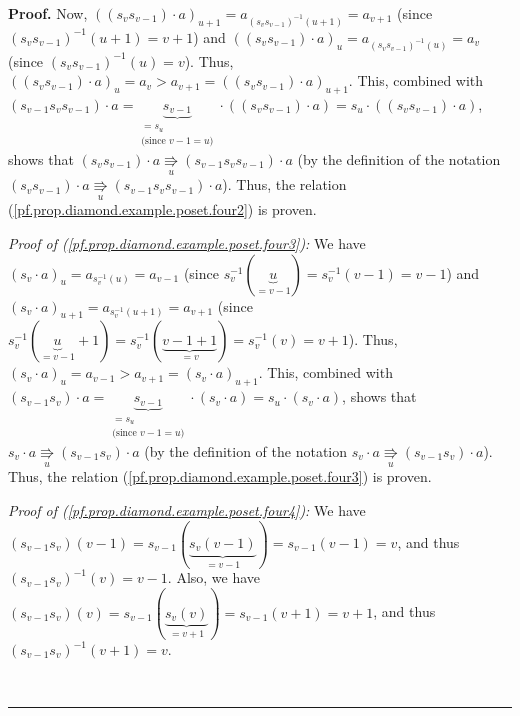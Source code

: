 \documentclass[numbers=enddot,12pt,final,onecolumn,notitlepage]{scrartcl}%
\theoremstyle{definition}
\newenvironment{proof}[1][Proof]{\noindent\textbf{#1.} }{\ \rule{0.5em}{0.5em}}
\newenvironment{verlong}{}{}
\begin{document}
\begin{proof}
\begin{verlong}
Now, $\left(  \left(  s_{v}s_{v-1}\right)  \cdot a\right)  _{u+1}
=a_{\left(
s_{v}s_{v-1}\right)  ^{-1}\left(  u+1\right)  }=a_{v+1}$ (since $\left(
s_{v}s_{v-1}\right)  ^{-1}\left(  u+1\right)  =v+1$) and $\left(  \left(
s_{v}s_{v-1}\right)  \cdot a\right)  _{u}=a_{\left(  s_{v}s_{v-1}\right)
^{-1}\left(  u\right)  }=a_{v}$ (since $\left(  s_{v}s_{v-1}\right)
^{-1}\left(  u\right)  =v$). Thus, $\left(  \left(  s_{v}s_{v-1}\right)
\cdot a\right)  _{u}=a_{v}>a_{v+1}=\left(  \left(  s_{v}s_{v-1}\right)
\cdot a\right)  _{u+1}$. This, combined with $\left(  s_{v-1}s_{v}%
s_{v-1}\right)  \cdot a=\underbrace{s_{v-1}}_{\substack{=s_u \\
\text{(since } v-1=u\text{)}}}
\cdot\left(  \left(  s_{v}s_{v-1}\right)  \cdot
a\right)
= s_u \cdot\left(  \left(  s_{v}s_{v-1}\right)  \cdot
a\right)$, shows that $\left(  s_{v}s_{v-1}\right)  \cdot
a\underset{u}{\Rrightarrow}\left(  s_{v-1}s_{v}s_{v-1}\right)  \cdot a$ (by
the definition of the notation $\left(  s_{v}s_{v-1}\right)  \cdot
a\underset{u}{\Rrightarrow}\left(  s_{v-1}s_{v}s_{v-1}\right)  \cdot a$).
Thus, the
relation (\ref{pf.prop.diamond.example.poset.four2}) is proven.

\textit{Proof of (\ref{pf.prop.diamond.example.poset.four3}):} We have
$\left(  s_{v}\cdot a\right)  _{u}=a_{s_{v}^{-1}\left(  u\right)
}=a_{v-1}$ (since $s_{v}^{-1}\left( \underbrace{u}_{=v-1}\right)
= s_v^{-1}\left(v-1\right) =v-1$) and $\left(
s_{v}\cdot a\right)  _{u+1}=a_{s_{v}^{-1}\left( u+1 \right)  }
=a_{v+1}$ (since $s_{v}^{-1}\left( \underbrace{u}_{=v-1}+1 \right)
= s_v^{-1}\left(\underbrace{v-1+1}_{=v}\right) = s_v^{-1}\left(v\right)
=v+1$). Thus, $\left(  s_{v}\cdot a\right)
_{u}=a_{v-1}>a_{v+1}=\left(  s_{v}\cdot a\right)  _{u+1}$. This, combined with
$\left(  s_{v-1}s_{v}\right)  \cdot a
=\underbrace{s_{v-1}}_{\substack{=s_u \\
\text{(since } v-1=u\text{)}}} \cdot\left(  s_{v}\cdot a\right)
= s_u \cdot\left(  s_{v}\cdot a\right)$,
shows that $s_{v}\cdot a\underset{u}{\Rrightarrow}\left(  s_{v-1}%
s_{v}\right)  \cdot a$ (by the definition of the notation $s_{v}\cdot
a\underset{u}{\Rrightarrow}\left(  s_{v-1}s_{v}\right)  \cdot a$).
Thus, the relation
(\ref{pf.prop.diamond.example.poset.four3}) is proven.

\textit{Proof of (\ref{pf.prop.diamond.example.poset.four4}):} We have
$\left(  s_{v-1}s_{v}\right)  \left(  v-1\right)  =s_{v-1}\left(
\underbrace{s_{v}\left(  v-1\right)  }_{=v-1}\right)  =s_{v-1}\left(
v-1\right)  =v$, and thus $\left(  s_{v-1}s_{v}\right)  ^{-1}\left(  v\right)
=v-1$. Also, we have $\left(  s_{v-1}s_{v}\right)  \left(  v\right)
=s_{v-1}\left(  \underbrace{s_{v}\left(  v\right)  }_{=v+1}\right)
=s_{v-1}\left(  v+1\right)  =v+1$, and thus $\left(  s_{v-1}s_{v}\right)
^{-1}\left(  v+1\right)  =v$.


\end{verlong}
\end{proof}
\end{document}
